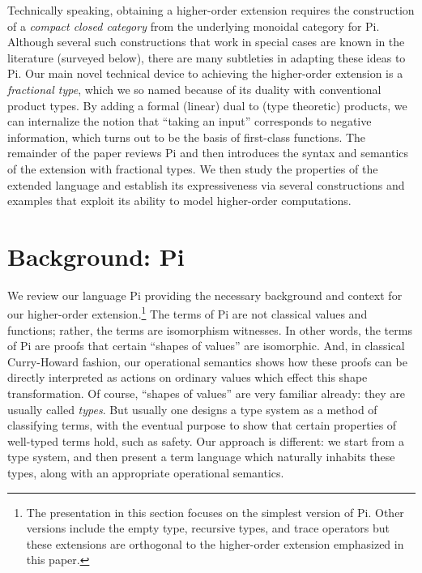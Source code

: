 \documentclass{llncs}
\newcommand{\roshan}[1]{\textsc{Roshan says:} 
  \textit{#1}
}
\begin{document}
Technically speaking, obtaining a higher-order extension requires the
construction of a \emph{compact closed category} from the underlying monoidal
category for {{Pi}}. Although several such constructions that work in special
cases are known in the literature (surveyed below), there are many subtleties
in adapting these ideas to {{Pi}}. Our main novel technical device to
achieving the higher-order extension is a \emph{fractional type}, which we so
named because of its duality with conventional product types.  By adding a
formal (linear) dual to (type theoretic) products, we can internalize the
notion that ``taking an input'' corresponds to negative information, which
turns out to be the basis of first-class functions. The remainder of the
paper reviews {{Pi}} and then introduces the syntax and semantics of the
extension with fractional types. We then study the properties of the extended
language and establish its expressiveness via several constructions and
examples that exploit its ability to model higher-order computations.


\section{Background: {{Pi}} }
\label{sec:pi}

We review our language {{Pi}} providing the necessary background and
context for our higher-order extension.\footnote{The presentation in this
  section focuses on the simplest version of {{Pi}}. Other versions
  include the empty type, recursive types, and trace operators but these
  extensions are orthogonal to the higher-order extension emphasized in this
  paper.} The terms of {{Pi}} are not classical values and functions;
rather, the terms are isomorphism witnesses.  In other words, the terms of
{{Pi}} are proofs that certain ``shapes of values'' are isomorphic.
And, in classical Curry-Howard fashion, our operational semantics shows how
these proofs can be directly interpreted as actions on ordinary values which
effect this shape transformation. Of course, ``shapes of values'' are very
familiar already: they are usually called \emph{types}.  But usually one
designs a type system as a method of classifying terms, with the eventual
purpose to show that certain properties of well-typed terms hold, such as
safety.  Our approach is different: we start from a type system, and then
present a term language which naturally inhabits these types, along with an
appropriate operational semantics.
\end{document}
